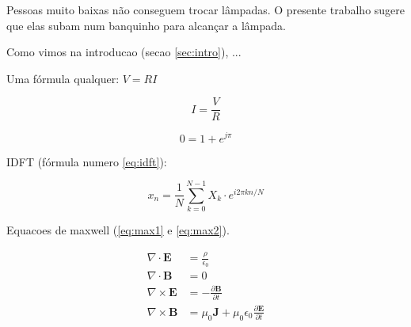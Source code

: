 \documentclass{article}
\newcommand{\vetor}[1]{\textbf{#1}}
\begin{document}
Pessoas muito baixas não conseguem trocar lâmpadas.
O presente trabalho sugere que elas subam num
banquinho para alcançar a lâmpada.

\hfill

Como vimos na introducao (secao \ref{sec:intro}),
...

Uma fórmula qualquer: $V=R I$

$$I = \frac{V}{R}$$

$$0=1+e^{j\pi}$$

IDFT (fórmula numero \ref{eq:idft}):

\begin{equation}
\label{eq:idft}
x_n = \frac{1}{N}
\sum_{k=0}^{N-1} X_k \cdot
e^{i2\pi kn/N}
\end{equation}

Equacoes de maxwell (\ref{eq:max1} e \ref{eq:max2}).

\begin{align}
\label{eq:max1}
\nabla \cdot \vetor{E} & = \frac{\rho}{\epsilon_0} \\
\label{eq:max2}
\nabla \cdot \vetor{B} & = 0 \\
\nabla \times \vetor{E}
& = - \frac{\partial \vetor{B}}{\partial t} \\
\nabla \times \vetor{B} & =
\mu_0\vetor{J} + \mu_0 \epsilon_0
\frac{\partial \vetor{E}}{\partial t}
\end{align}
\end{document}

